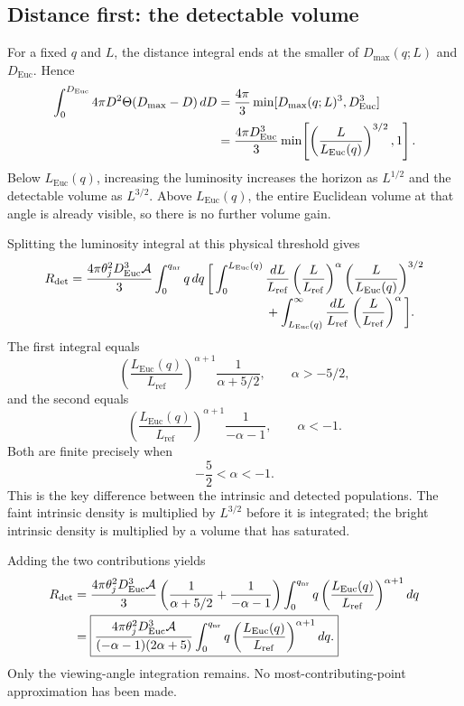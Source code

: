 \documentclass[11pt,a4paper]{article}
\newcommand{\Euc}{\mathrm{Euc}}
\newcommand{\nr}{\mathrm{nr}}
\newcommand{\Lref}{L_{\mathrm{ref}}}
\newcommand{\Rdet}{R_{\mathrm{det}}}
\begin{document}
\subsection{Distance first: the detectable volume}
For a fixed $q$ and $L$, the distance integral ends at the smaller of
$D_{\max}(q;L)$ and $D_\Euc$. Hence
\begin{align}
 \int_0^{D_\Euc}4\pi D^2
 \Theta(D_{\max}-D)\,dD
 &=\frac{4\pi}{3}\min[D_{\max}(q;L)^3,D_\Euc^3]\notag\\
 &=\frac{4\pi D_\Euc^3}{3}
 \min\!\left[\left(\frac L{L_\Euc(q)}\right)^{3/2},1\right].
 \label{eq:volume}
\end{align}
Below $L_\Euc(q)$, increasing the luminosity increases the horizon as
$L^{1/2}$ and the detectable volume as $L^{3/2}$. Above $L_\Euc(q)$,
the entire Euclidean volume at that angle is already visible, so there is
no further volume gain.

Splitting the luminosity integral at this physical threshold gives
\begin{align}
 \Rdet={}&\frac{4\pi\theta_j^2 D_\Euc^3\mathcal A}{3}
 \int_0^{q_\nr}q\,dq\,
 \bigg[\int_0^{L_\Euc(q)}\frac{dL}{\Lref}
 \left(\frac L{\Lref}\right)^\alpha
 \left(\frac L{L_\Euc(q)}\right)^{3/2}\notag\\[-2pt]
 &\hspace{5.0cm}+\int_{L_\Euc(q)}^\infty
 \frac{dL}{\Lref}\left(\frac L{\Lref}\right)^\alpha\bigg].
 \label{eq:split-L}
\end{align}
The first integral equals
\begin{equation}
 \left(\frac{L_\Euc(q)}{\Lref}\right)^{\alpha+1}
 \frac1{\alpha+5/2},\qquad \alpha>-5/2,
 \label{eq:faint-integral}
\end{equation}
and the second equals
\begin{equation}
 \left(\frac{L_\Euc(q)}{\Lref}\right)^{\alpha+1}
 \frac1{-\alpha-1},\qquad \alpha<-1.
 \label{eq:bright-integral}
\end{equation}
Both are finite precisely when
\begin{equation}
 \boxed{-\frac52<\alpha<-1.}
 \label{eq:convergence}
\end{equation}
This is the key difference between the intrinsic and detected populations.
The faint intrinsic density is multiplied by $L^{3/2}$ before it is integrated;
the bright intrinsic density is multiplied by a volume that has saturated.

Adding the two contributions yields
\begin{align}
 \Rdet={}&\frac{4\pi\theta_j^2D_\Euc^3\mathcal A}{3}
 \left(\frac1{\alpha+5/2}+\frac1{-\alpha-1}\right)
 \int_0^{q_\nr}q\left(\frac{L_\Euc(q)}{\Lref}\right)^{\alpha+1}dq\notag\\
 ={}&\boxed{\frac{4\pi\theta_j^2D_\Euc^3\mathcal A}
 {(-\alpha-1)(2\alpha+5)}
 \int_0^{q_\nr}q\left(\frac{L_\Euc(q)}{\Lref}\right)^{\alpha+1}dq.}
 \label{eq:rate-physical}
\end{align}
Only the viewing-angle integration remains. No most-contributing-point
approximation has been made.
\end{document}
